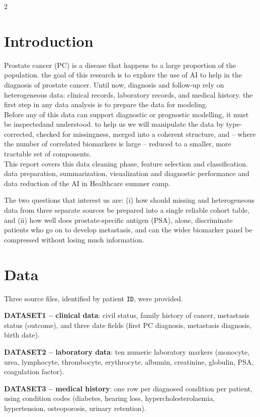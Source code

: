 ﻿\documentclass[a4paper,10pt]{article}
\begin{document}
\begin{multicols*}{2}
\tableofcontents

\setlength{\parskip}{1pt}
\columnbreak
\section{Introduction}

Prostate cancer (PC) is a disease that happens to a large proportion of the population. the goal of this research is to explore the use of AI to help in the diagnosis of prostate cancer. 
Until now, diagnosis and follow-up rely on heterogeneous data: clinical records, laboratory records, and medical history. the first step in any data analysis is to prepare the data for modeling.\\
Before any of this data can support diagnostic or prognostic modelling, it must be inspectedand understood. to help us we will manipulate the data by type-corrected, checked for missingness, merged into a coherent structure, and -- where the number of correlated biomarkers is large -- reduced to a smaller, more tractable set of components.\\
This report covers this data cleaning phase, feature selection and classification. data preparation, summarization, visualization and diagnostic performance and data reduction of the AI in Healthcare summer camp.

The two questions that interest us are: (i) how should missing and heterogeneous data from three separate sources be prepared into a single reliable cohort table, and (ii) how well does prostate-specific antigen (PSA), alone, discriminate patients who go on to develop metastasis, and can the wider biomarker panel be compressed without losing much information.

\section{Data}

Three source files, identified by patient \texttt{ID}, were provided.

\textbf{DATASET1 -- clinical data}: civil status, family history of cancer, metastasis status (outcome), and three date fields (first PC diagnosis, metastasis diagnosis, birth date).

\textbf{DATASET2 -- laboratory data}: ten numeric laboratory markers (monocyte, urea, lymphocyte, thrombocyte, erythrocyte, albumin, creatinine, globulin, PSA, coagulation factor).

\textbf{DATASET3 -- medical history}: one row per diagnosed condition per patient, using condition codes (diabetes, hearing loss, hypercholesterolaemia, hypertension, osteoporosis, urinary retention).


\end{multicols*}
\end{document}
